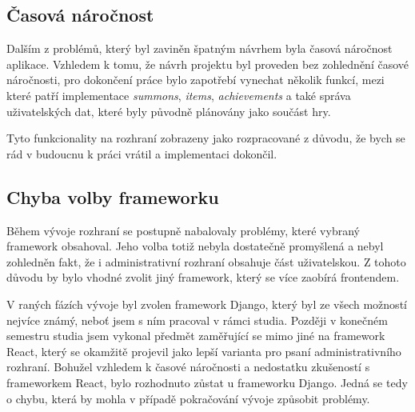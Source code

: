 \subsection*{Časová náročnost}
\label{subsec:implementation-problems-time}
Dalším z problémů, který byl zaviněn špatným návrhem byla časová náročnost aplikace. Vzhledem k tomu, že návrh projektu byl proveden bez zohlednění časové náročnosti, pro dokončení práce bylo zapotřebí vynechat několik funkcí, mezi které patří implementace \textit{summons}, \textit{items}, \textit{achievements} a také správa uživatelských dat, které byly původně plánovány jako součást hry.

Tyto funkcionality na rozhraní zobrazeny jako rozpracované z důvodu, že bych se rád v budoucnu k práci vrátil a implementaci dokončil.

\subsection*{Chyba volby frameworku}
\label{subsec:implementation-problems-framework}
Během vývoje rozhraní se postupně nabalovaly problémy, které vybraný framework obsahoval. Jeho volba totiž nebyla dostatečně promyšlená a nebyl zohledněn fakt, že i administrativní rozhraní obsahuje část uživatelskou. Z tohoto důvodu by bylo vhodné zvolit jiný framework, který se více zaobírá frontendem.

V raných fázích vývoje byl zvolen framework Django, který byl ze všech možností nejvíce známý, neboť jsem s ním pracoval v rámci studia. Později v konečném semestru studia jsem vykonal předmět zaměřující se mimo jiné na framework React, který se okamžitě projevil jako lepší varianta pro psaní administrativního rozhraní. Bohužel vzhledem k časové náročnosti a nedostatku zkušeností s frameworkem React, bylo rozhodnuto zůstat u frameworku Django. Jedná se tedy o chybu, která by mohla v případě pokračování vývoje způsobit problémy.

\endinput